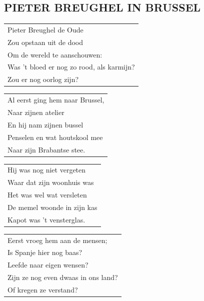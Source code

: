 \documentclass{article}
\begin{document}
\subsection*{PIETER BREUGHEL IN BRUSSEL}
\begin{flushleft}
\begin{tabularx}{0.8\textwidth} {
   >{\raggedright\arraybackslash}X}
   Pieter Breughel de Oude\\
Zou opstaan uit de dood\\
Om de wereld te aanschouwen:\\
Was ’t bloed er nog zo rood, als karmijn?\\
Zou er nog oorlog zijn?\\
\end{tabularx}
\end{flushleft}\begin{flushleft}
\begin{tabularx}{0.8\textwidth} {
   >{\raggedright\arraybackslash}X}
Al eerst ging hem naar Brussel,\\
Naar zijnen atelier\\
En hij nam zijnen bussel\\
Penselen en wat houtskool mee\\
Naar zijn Brabantse stee.\\
\end{tabularx}
\end{flushleft}\begin{flushleft}
\begin{tabularx}{0.8\textwidth} {
   >{\raggedright\arraybackslash}X}
Hij was nog niet vergeten\\
Waar dat zijn woonhuis was\\
Het was wel wat versleten\\
De memel woonde in zijn kas\\
Kapot was ’t vensterglas.\\
\end{tabularx}
\end{flushleft}\begin{flushleft}
\begin{tabularx}{0.8\textwidth} {
   >{\raggedright\arraybackslash}X}
Eerst vroeg hem aan de mensen;\\
Is Spanje hier nog baas?\\
Leefde naar eigen wensen?\\
Zijn ze nog even dwaas in ons land?\\
Of kregen ze verstand?\\

\end{tabularx}
\end{flushleft}
\end{document}
